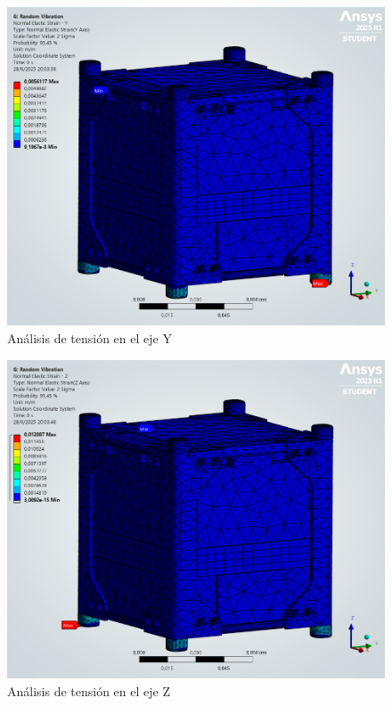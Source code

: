   \begin{figure}[H]
    \centering
    \includegraphics[width=14cm]{image/fem/ansys_cubesat-vibration_strain-y.png}
    \caption{Análisis de tensión en el eje Y}
    \label{fig:fem_strain-y}
  \end{figure}

  \begin{figure}[H]
    \centering
    \includegraphics[width=14cm]{image/fem/ansys_cubesat-vibration_strain-z.png}
    \caption{Análisis de tensión en el eje Z}
    \label{fig:fem_strain-z}
  \end{figure}

